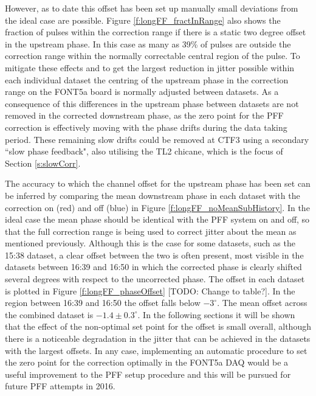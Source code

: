 However, as to date this offset has been set up manually small deviations from the ideal case are possible. Figure \ref{f:longFF_fractInRange} also shows the fraction of pulses within the correction range if there is a static two degree offset in the upstream phase. In this case as many as 39\% of pulses are outside the correction range within the normally correctable central region of the pulse. To mitigate these effects and to get the largest reduction in jitter possible within each individual dataset the centring of the upstream phase in the correction range on the FONT5a board is normally adjusted between datasets. As a consequence of this differences in the upstream phase between datasets are not removed in the corrected downstream phase, as the zero point for the PFF correction is effectively moving with the phase drifts during the data taking period. These remaining slow drifts could be removed at CTF3 using a secondary ``slow phase feedback", also utilising the TL2 chicane, which is the focus of Section \ref{s:slowCorr}.

The accuracy to which the channel offset for the upstream phase has been set can be inferred by comparing the mean downstream phase in each dataset with the correction on (red) and off (blue) in Figure \ref{f:longFF_noMeanSubHistory}. In the ideal case the mean phase should be identical with the PFF system on and off, so that the full correction range is being used to correct jitter about the mean as mentioned previously. Although this is the case for some datasets, such as the 15:38 dataset, a clear offset between the two is often present, most visible in the datasets between 16:39 and 16:50 in which the corrected phase is clearly shifted several degrees with respect to the uncorrected phase. The offset in each dataset is plotted in Figure \ref{f:longFF_phaseOffset} [TODO: Change to table?]. In the region between 16:39 and 16:50 the offset falls below \(-3^\circ\). The mean offset across the combined dataset is \(-1.4\pm0.3^\circ\). In the following sections it will be shown that the effect of the non-optimal set point for the offset is small overall, although there is a noticeable degradation in the jitter that can be achieved in the datasets with the largest offsets. In any case, implementing an automatic procedure to set the zero point for the correction optimally in the FONT5a DAQ would be a useful improvement to the PFF setup procedure and this will be pursued for future PFF attempts in 2016.

